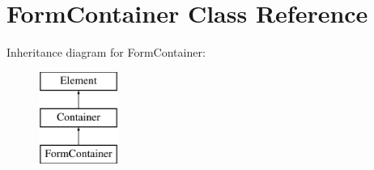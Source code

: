 \hypertarget{class_form_container}{
\section{FormContainer Class Reference}
\label{class_form_container}
}
Inheritance diagram for FormContainer:\begin{figure}[H]
\begin{center}
\leavevmode
\includegraphics[height=3.000000cm]{class_form_container}
\end{center}
\end{figure}
